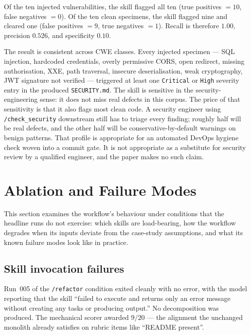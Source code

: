 \documentclass[journal]{IEEEtran}
\begin{document}
Of the ten injected vulnerabilities, the skill flagged all ten
(true positives $= 10$, false negatives $= 0$). Of the ten clean
specimens, the skill flagged nine and cleared one (false
positives $= 9$, true negatives $= 1$). Recall is therefore
$1.00$, precision $0.526$, and specificity $0.10$.

The result is consistent across CWE classes. Every injected
specimen --- SQL injection, hardcoded credentials, overly permissive
CORS, open redirect, missing authorisation, XXE, path traversal,
insecure deserialisation, weak cryptography, JWT signature not
verified --- triggered at least one \texttt{Critical} or
\texttt{High} severity entry in the produced \texttt{SECURITY.md}.
The skill is sensitive in the security-engineering sense: it does
not miss real defects in this corpus. The price of that sensitivity
is that it also flags most clean code. A security engineer using
\texttt{/check\_security} downstream still has to triage every
finding; roughly half will be real defects, and the other half will
be conservative-by-default warnings on benign patterns. That
profile is appropriate for an automated DevOps hygiene check
woven into a commit gate. It is not appropriate as a substitute
for security review by a qualified engineer, and the paper makes
no such claim.

\section{Ablation and Failure Modes}
\label{sec:ablation}

This section examines the workflow's behaviour under conditions
that the headline runs do not exercise: which skills are
load-bearing, how the workflow degrades when its inputs deviate
from the case-study assumptions, and what its known failure modes
look like in practice.

\subsection{Skill invocation failures}
\label{sec:ablation-failures}

Run~005 of the \texttt{/refactor} condition exited cleanly with no
error, with the model reporting that the skill ``failed to execute
and returns only an error message without creating any tasks or
producing output.'' No decomposition was produced. The mechanical
scorer awarded $9/20$ --- the alignment the unchanged monolith
already satisfies on rubric items like ``README present''.
\end{document}
